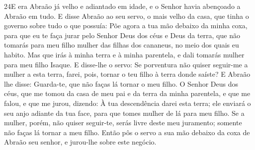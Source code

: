 \smallskip

\lettrine{24} E era Abraão já velho e adiantado em idade, e o
Senhor havia abençoado a Abraão em tudo. E disse Abraão ao seu
servo, o mais velho da casa, que tinha o governo sobre tudo o que
possuía: Põe agora a tua mão debaixo da minha coxa, para que eu
te faça jurar pelo Senhor Deus dos céus e Deus da terra, que não
tomarás para meu filho mulher das filhas dos cananeus, no meio dos
quais eu habito. Mas que irás à minha terra e à minha parentela,
e dali tomarás mulher para meu filho Isaque. E disse-lhe o
servo: Se porventura não quiser seguir-me a mulher a esta terra,
farei, pois, tornar o teu filho à terra donde saíste? E Abraão
lhe disse: Guarda-te, que não faças lá tornar o meu filho. O
Senhor Deus dos céus, que me tomou da casa de meu pai e da terra da
minha parentela, e que me falou, e que me jurou, dizendo: À tua
descendência darei esta terra; ele enviará o seu anjo adiante da tua
face, para que tomes mulher de lá para meu filho. Se a mulher,
porém, não quiser seguir-te, serás livre deste meu juramento;
somente não faças lá tornar a meu filho. Então pôs o servo a sua
mão debaixo da coxa de Abraão seu senhor, e jurou-lhe sobre este
negócio.

